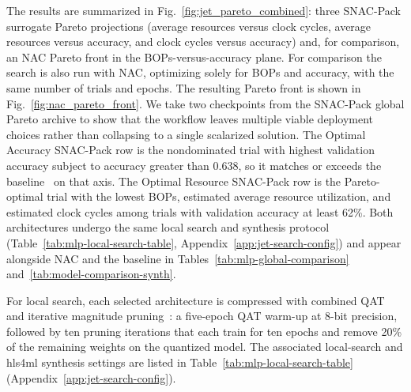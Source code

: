 \documentclass[11pt]{article}
\begin{document}

The results are summarized in Fig.~\ref{fig:jet_pareto_combined}: three SNAC-Pack surrogate Pareto projections (average resources versus clock cycles, average resources versus accuracy, and clock cycles versus accuracy) and, for comparison, an NAC Pareto front in the BOPs-versus-accuracy plane.
For comparison the search is also run with NAC, optimizing solely for BOPs and accuracy, with the same number of trials and epochs.
The resulting Pareto front is shown in Fig.~\ref{fig:nac_pareto_front}.
We take two checkpoints from the SNAC-Pack global Pareto archive to show that the workflow leaves multiple viable deployment choices rather than collapsing to a single scalarized solution.
The Optimal Accuracy SNAC-Pack row is the nondominated trial with highest validation accuracy subject to accuracy greater than 0.638, so it matches or exceeds the baseline~\cite{Odagiu_2024} on that axis.
The Optimal Resource SNAC-Pack row is the Pareto-optimal trial with the lowest BOPs, estimated average resource utilization, and estimated clock cycles among trials with validation accuracy at least 62\%.
Both architectures undergo the same local search and synthesis protocol (Table~\ref{tab:mlp-local-search-table}, Appendix~\ref{app:jet-search-config}) and appear alongside NAC and the baseline in Tables~\ref{tab:mlp-global-comparison} and~\ref{tab:model-comparison-synth}.

For local search, each selected architecture is compressed with combined QAT and iterative magnitude pruning~\cite{quantization_survey,frankle2019stabilizing,frankle2018lottery}: a five-epoch QAT warm-up at 8-bit precision, followed by ten pruning iterations that each train for ten epochs and remove 20\% of the remaining weights on the quantized model.
The associated local-search and hls4ml synthesis settings are listed in Table~\ref{tab:mlp-local-search-table} (Appendix~\ref{app:jet-search-config}).
\end{document}
